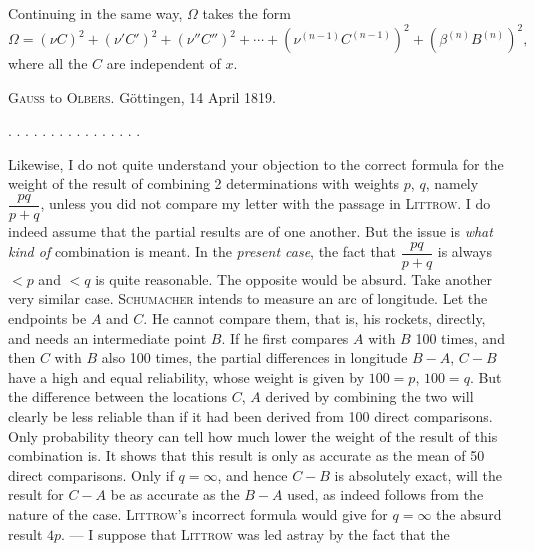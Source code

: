 Continuing in the same way, $\Omega$ takes the form
\[
\Omega = (\nu C)^2+(\nu' C')^2+(\nu'' C'')^2+\cdots+(\nu^{(n-1)} C^{(n-1)})^2+(\beta^{(n)} B^{(n)})^2,
\]
where all the $C$ are independent of $x$.



\begin{center}
\textsc{Gauss} to \textsc{Olbers}. Göttingen, 14 April 1819.
\end{center}

\begin{center}
. . . . . . . . . . . . . . . .
\end{center}

Likewise, I do not quite understand your objection to the correct formula for the weight of the result of combining 2 determinations with weights $p$, $q$, namely $\dfrac{pq}{p+q}$, unless you did not compare my letter with the passage in \textsc{Littrow}. I do indeed assume that the partial results are  of one another. But the issue is \emph{what kind of} combination is meant. In the \emph{present case}, the fact that $\dfrac{pq}{p+q}$ is always $<p$ and $<q$ is quite reasonable. The opposite would be absurd. Take another very similar case. \textsc{Schumacher} intends to measure an arc of longitude. Let the endpoints be $A$ and $C$. He cannot compare them, that is, his rockets, directly, and needs an intermediate point $B$. If he first compares $A$ with $B$ 100 times, and then $C$ with $B$ also 100 times, the partial differences in longitude $B-A$, $C-B$ have a high and equal reliability, whose weight is given by $100=p$, $100=q$. But the difference between the locations $C$, $A$ derived by combining the two will clearly be less reliable than if it had been derived from 100 direct comparisons. Only probability theory can tell how much lower the weight of the result of this combination is. It shows that this  result is only as accurate as the mean of 50 direct comparisons. Only if $q=\infty$, and hence $C-B$ is absolutely exact, will the  result for $C-A$ be as accurate as the $B-A$ used, as indeed follows from the nature of the case. \textsc{Littrow}'s incorrect formula would give for $q=\infty$ the absurd result $4p$. --- I suppose that \textsc{Littrow} was led astray by the fact that the
